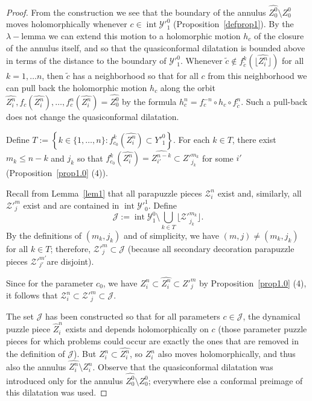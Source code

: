 \documentclass[12pt,a4paper]{amsart}
\newcommand{\JJ}{\mathcal J}
\newcommand{\YYp}{{\mathcal Y'}}
\newcommand{\YY}{\mathcal Y}
\newcommand{\ZZ}{\mathcal Z}
\newcommand{\intr}{\operatorname{int}}
\begin{document}
  \begin{proof}
  From the construction we see that the boundary of the annulus
  $\widehat{Z^0_0}\setminus
  Z^0_0$ moves holomorphically whenever $c\in \intr\YY'^0_1$ (Proposition~\ref{defprop1}). By the
  $\lambda-$lemma we can extend this motion to a holomorphic motion $h_c$ of the closure of the annulus itself,
  and so that the quasiconformal dilatation is bounded above in terms of the
distance to the boundary of
   $\YY'^0_1$. Whenever $\tilde c\not\in
   f_{\tilde c}^k\left(\lfloor\widehat{Z^n_i}\rfloor\right)$ for all
$k=1,\ldots n$, then $\tilde c$
   has a neighborhood so that for all $c$ from this neighborhood we
can pull back
   the holomorphic motion $h_c$ along the orbit
$\widehat{Z^n_i},f_c\left(\widehat{Z^n_i}\right),\ldots ,
   f_c^n\left(\widehat{Z^n_i}\right)=\widehat{Z^0_0}$ by the formula
$h^n_c=f_c^{-n}\circ h_c\circ
   f_{\tilde c}^n$. Such a pull-back does not change the quasiconformal
   dilatation.



Define $T:=\left\{k\in\{1,\dots,n\}\colon
f_{c_0}^k\left(\widehat{Z^n_i}\right)\subset Y'^0_1\right\}$. For
each $k\in T$, there exist $m_k\le n-k$ and $j_k$ so that
$f_{c_0}^k\left(\widehat{Z^n_i}\right)=\widehat{Z^{n-k}_{i'}}\subset
Z'^{m_k}_{j_k}$ for some $i'$ (Proposition~\ref{prop1.0} (4)).


Recall from Lemma~\ref{lem1} that all parapuzzle pieces $\ZZ^n_i$
exist and, similarly, all $\ZZ'^m_j$ exist and are contained in
$\intr\YYp^1_0$. Define
\[
\JJ:=\intr \YY^0_1\setminus \bigcup_{k\in T}\lfloor
   \ZZ'^{m_k}_{j_k} \rfloor.
\]
By the definitions of $(m_k,j_k)$ and of simplicity, we have
$(m,j)\neq(m_k,j_k)$ for all $k\in T$; therefore, $\ZZ'^m_j\subset
\JJ$ (because all secondary decoration parapuzzle pieces
$\ZZ'^{m'}_{j'}$are disjoint).

Since for the parameter $c_0$, we have
$Z^n_i\subset\widehat{Z^n_i}\subset Z'^m_j$ by
Proposition~\ref{prop1.0} (4), it follows that
 $\ZZ^n_i\subset  \ZZ'^m_j\subset \JJ$.

The set $\JJ$ has been constructed so that for all parameters
$c\in\JJ$, the dynamical puzzle piece $\widehat Z^n_i$ exists and
depends holomorphically on $c$ (those parameter puzzle pieces for
which problems could occur are exactly the ones that are removed in
the definition of $\JJ$). But $Z^n_i\subset \widehat{Z^n_i}$, so
$Z^n_i$ also moves holomorphically, and thus also the annulus
$\widehat{Z^n_i} \setminus   Z^n_i$. Observe that the quasiconformal
dilatation was introduced only for the annulus
$\widehat{Z^0_0}\setminus Z^0_0$; everywhere else a conformal
preimage of this dilatation was used.


\end{proof}
\end{document}
